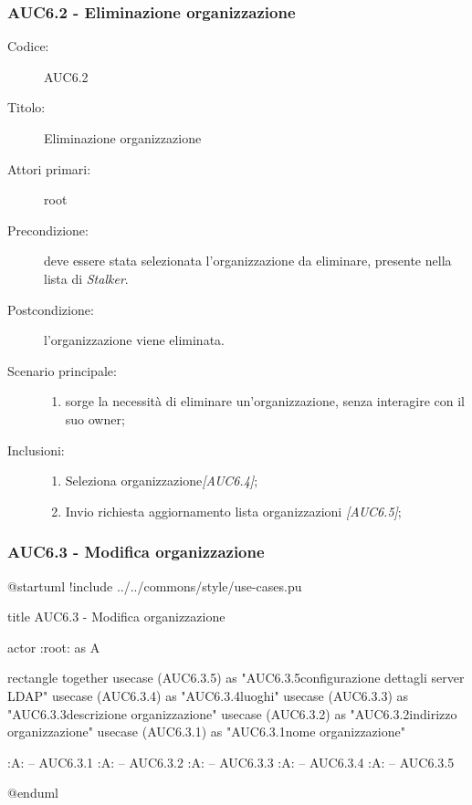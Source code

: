 \documentclass[casi-duso]{subfiles}
\begin{document}
\subsubsection{AUC6.2 - Eliminazione organizzazione}%
\label{subsub:AUC6.2}
\begin{description}
  \item[Codice:] AUC6.2
  \item[Titolo:] Eliminazione organizzazione
  \item[Attori primari:] root
  \item[Precondizione:] deve essere stata selezionata l'organizzazione da eliminare, presente nella lista di \emph{Stalker}.
  \item[Postcondizione:] l'organizzazione viene eliminata.
  \item[Scenario principale:]
  \begin{enumerate}
    \item sorge la necessità di eliminare un'organizzazione, senza interagire con il suo owner;
  \end{enumerate}
  \item[Inclusioni:]
  \begin{enumerate}
    \item Seleziona organizzazione\emph{[AUC6.4]};
    \item Invio richiesta aggiornamento lista organizzazioni \emph{[AUC6.5]};
  \end{enumerate}
\end{description}

\subsubsection{AUC6.3 - Modifica organizzazione}%
\label{subsub:AUC6.3}

\begin{plantuml}
@startuml
!include ../../commons/style/use-cases.pu

title AUC6.3 - Modifica organizzazione

actor :root: as A

rectangle {
  together {
    usecase (AUC6.3.5) as "AUC6.3.5\nModifica configurazione dettagli server LDAP"
    usecase (AUC6.3.4) as "AUC6.3.4\nGestione luoghi"
    usecase (AUC6.3.3) as "AUC6.3.3\nModifica descrizione organizzazione"
    usecase (AUC6.3.2) as "AUC6.3.2\nModifica indirizzo organizzazione"
    usecase (AUC6.3.1) as "AUC6.3.1\nModifica nome organizzazione" 
  }
}

:A: -- AUC6.3.1
:A: -- AUC6.3.2
:A: -- AUC6.3.3
:A: -- AUC6.3.4
:A: -- AUC6.3.5

@enduml
\end{plantuml}
\end{document}
